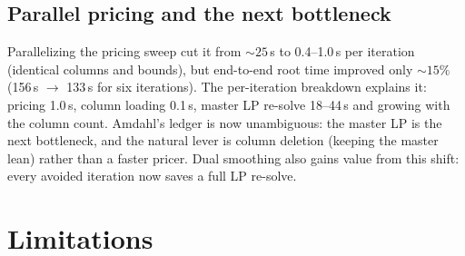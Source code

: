\documentclass[11pt]{article}
\begin{document}
\subsection{Parallel pricing and the next bottleneck}
\label{sec:results:parallel}

Parallelizing the pricing sweep cut it from ${\sim}25$\,s to
0.4--1.0\,s per iteration (identical columns and bounds), but end-to-end
root time improved only ${\sim}15\%$ (156\,s $\to$ 133\,s for six
iterations). The per-iteration breakdown explains it: pricing 1.0\,s,
column loading 0.1\,s, master LP re-solve 18--44\,s and growing with the
column count. Amdahl's ledger is now unambiguous: the master LP is the
next bottleneck, and the natural lever is column deletion (keeping the
master lean) rather than a faster pricer. Dual smoothing also gains value
from this shift: every avoided iteration now saves a full LP re-solve.

\section{Limitations}\label{sec:limits}
\end{document}
